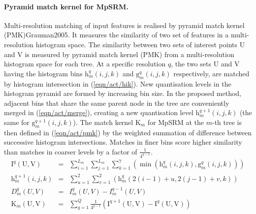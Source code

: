 \paragraph{Pyramid match kernel for MpSRM.}
Multi-resolution matching of input features is realised by pyramid match kernel (PMK){Grauman2005}. It measures the similarity of two set of features in a multi-resolution histogram space.
The similarity between two sets of interest points $\mathrm{U}$ and $\mathrm{V}$ is measured by pyramid match kernel (PMK) from a multi-resolution histogram space for each tree. At a specific resolution $q$, the two sets $\mathrm{U}$ and $\mathrm{V}$ having the histogram bins $\mathrm{h}^q_{m}(i,j,k)$ and $\mathrm{g}^q_{m}(i,j,k)$ respectively, are matched by histogram intersection in (\ref{eqn/act/hik}). New quantisation levels in the histogram pyramid are formed by increasing bin size. In the proposed method, adjacent bins that share the same parent node in the tree are conveniently merged in (\ref{eqn/act/merge}), creating a new quantisation level $\mathrm{h}^{q+1}_m(i,j,k)$ (the same for $\mathrm{g}^{q+1}_m(i,j,k)$). The match kernel $\mathrm{K}_m$ for MpSRM at the $m$-th tree is then defined in (\ref{eqn/act/pmk}) by the weighted summation of difference between successive histogram intersections. Matches in finer bins score higher similarity than matches in coarser levels by a factor of $\frac{1}{4^{q-1}}$.
\begin{align}
\label{eqn/act/hik}
\mathrm{I}^q(\mathrm{U},\mathrm{V}) &= & \displaystyle\sum_{i=1}^{L_m}\sum_{j=1}^{L_m}\sum_{k=1}^{7} \left( \min(\mathrm{h}^{q}_m(i,j,k), \mathrm{g}^{q}_m(i,j,k)) \right)\\
\label{eqn/act/merge}
\mathrm{h}^{q+1}_m(i,j,k) &= & \displaystyle\sum_{u=1}^{2}\sum_{v=1}^{2} \left( \mathrm{h}^{q}_m(2(i-1)+u,2(j-1)+v,k) \right)\\
\label{eqn/act/newcount}
D^{q}_m(U,V) &= & I^q_m(U,V) - I^{q-1}_m(U,V) \\
\label{eqn/act/pmk}
\mathrm{K}_m(\mathrm{U},\mathrm{V}) &= & \displaystyle\sum_{q = 1}^{Q}\frac{1}{4^{q-1}} \left( \mathrm{I}^{q+1}(\mathrm{U},\mathrm{V}) - \mathrm{I}^{q}(\mathrm{U},\mathrm{V}) \right)
\end{align}

